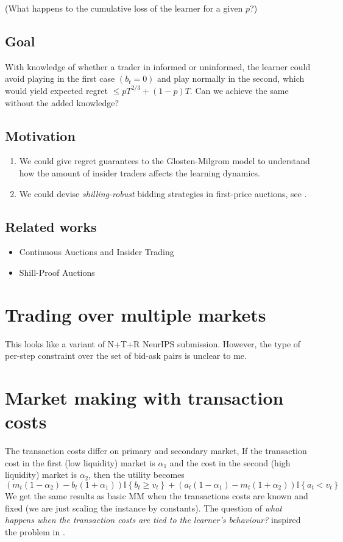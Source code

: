 \documentclass[a4paper,11pt]{article}
\newcommand{\lcb}[1]{\left\{#1\right\}}
\newcommand{\I}[1]{\mathbb{I}\lcb{#1}}
\begin{document}
(What happens to the cumulative loss of the learner for a given $p$?)

\subsection{Goal}
With knowledge of whether a trader in informed or uninformed, the learner could avoid playing in the first case $(b_t = 0)$ and play normally in the second, which would yield expected regret $\le p T^{2/3} + (1-p)T$. Can we achieve the same without the added knowledge?

\subsection{Motivation}
\begin{enumerate}
    \item We could give regret guarantees to the Glosten-Milgrom model to understand how the amount of insider traders affects the learning dynamics.
    \item We could devise \textit{shilling-robust} bidding strategies in first-price auctions, see \citep{Komo2024-em}.
\end{enumerate}

\subsection{Related works}
\begin{itemize}
    \item Continuous Auctions and Insider Trading \citep{kyleContinuousAuctionsInsider1985}
    \item Shill-Proof Auctions \citep{Komo2024-em}
\end{itemize}

\section{Trading over multiple markets}
This looks like a variant of N+T+R NeurIPS submission. However, the type of per-step constraint over the set of bid-ask pairs is unclear to me.

\section{Market making with transaction costs}
The transaction costs differ on primary and secondary market, If the transaction cost in the first (low liquidity) market is $\alpha_1$ and the cost in the second (high liquidity) market is $\alpha_2$, then the utility becomes
\[
    (m_t (1 - \alpha_2) - b_t (1 + \alpha_1)) \I{b_t \ge v_t}
    + (a_t (1 - \alpha_1) - m_t (1 + \alpha_2) ) \I{a_t < v_t}
\] 
We get the same results as basic MM when the transactions costs are known and fixed (we are just scaling the instance by constants). The question of \textit{what happens when the transaction costs are tied to the learner's behaviour?} inspired the problem in . 
\end{document}
